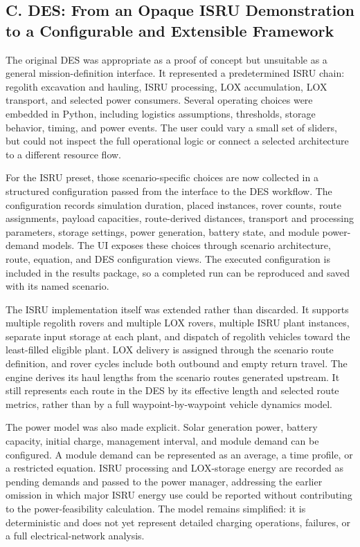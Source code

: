 \subsection{C. DES: From an Opaque ISRU Demonstration to a Configurable and Extensible Framework}

The original DES was appropriate as a proof of concept but unsuitable as a general mission-definition interface. It represented a predetermined ISRU chain: regolith excavation and hauling, ISRU processing, LOX accumulation, LOX transport, and selected power consumers. Several operating choices were embedded in Python, including logistics assumptions, thresholds, storage behavior, timing, and power events. The user could vary a small set of sliders, but could not inspect the full operational logic or connect a selected architecture to a different resource flow.

For the ISRU preset, those scenario-specific choices are now collected in a structured configuration passed from the interface to the DES workflow. The configuration records simulation duration, placed instances, rover counts, route assignments, payload capacities, route-derived distances, transport and processing parameters, storage settings, power generation, battery state, and module power-demand models. The UI exposes these choices through scenario architecture, route, equation, and DES configuration views. The executed configuration is included in the results package, so a completed run can be reproduced and saved with its named scenario.

The ISRU implementation itself was extended rather than discarded. It supports multiple regolith rovers and multiple LOX rovers, multiple ISRU plant instances, separate input storage at each plant, and dispatch of regolith vehicles toward the least-filled eligible plant. LOX delivery is assigned through the scenario route definition, and rover cycles include both outbound and empty return travel. The engine derives its haul lengths from the scenario routes generated upstream. It still represents each route in the DES by its effective length and selected route metrics, rather than by a full waypoint-by-waypoint vehicle dynamics model.

The power model was also made explicit. Solar generation power, battery capacity, initial charge, management interval, and module demand can be configured. A module demand can be represented as an average, a time profile, or a restricted equation. ISRU processing and LOX-storage energy are recorded as pending demands and passed to the power manager, addressing the earlier omission in which major ISRU energy use could be reported without contributing to the power-feasibility calculation. The model remains simplified: it is deterministic and does not yet represent detailed charging operations, failures, or a full electrical-network analysis.

